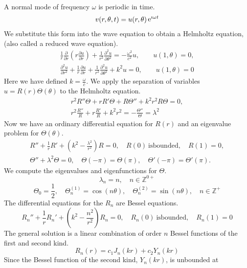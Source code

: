 {%
\begin{Solution}
  \label{solution normal modes drum unit radius}
  A normal mode of frequency $\omega$ is periodic in time.
  \[
  v(r,\theta,t) = u(r,\theta) \mathop{\mathrm{e}}\nolimits^{\imath \omega t}
  \]
  We substitute this form into the wave equation to obtain a Helmholtz equation,
  (also called a reduced wave equation).
  \begin{gather*}
    \frac{1}{r} \frac{\partial}{\partial r} \left( r \frac{\partial u}{\partial r} \right) +
    \frac{1}{r^2} \frac{\partial^2 u}{\partial \theta^2} = -\frac{\omega^2}{c^2} u, \qquad
    u(1,\theta) = 0, 
    \\
    \frac{\partial^2 u}{\partial r^2} + \frac{1}{r} \frac{\partial u}{\partial r} +
    \frac{1}{r^2} \frac{\partial^2 u}{\partial \theta^2} + k^2 u = 0, \qquad
    u(1,\theta) = 0
  \end{gather*}
  Here we have defined $k = \frac{\omega}{c}$.
  We apply the separation of variables $u = R(r) \Theta(\theta)$ to the Helmholtz 
  equation.
  \begin{gather*}
    r^2 R'' \Theta + r R' \Theta + R \Theta'' + k^2 r^2 R \Theta = 0, 
    \\
    r^2 \frac{R''}{R} + r \frac{R'}{R} + k^2 r^2 = - \frac{\Theta''}{\Theta} = \lambda^2
  \end{gather*}
  Now we have an ordinary differential equation for $R(r)$ and
  an eigenvalue problem for $\Theta(\theta)$.
  \begin{gather*}
    R'' + \frac{1}{r} R' + \left( k^2 - \frac{\lambda^2}{r^2} \right) R = 0,
    \quad R(0)\ \mathrm{is bounded}, \quad R(1) = 0, 
    \\
    \Theta'' + \lambda^2 \Theta = 0, \quad \Theta(-\pi) = \Theta(\pi), \quad \Theta'(-\pi) = \Theta'(\pi).
  \end{gather*}
  We compute the eigenvalues and eigenfunctions for $\Theta$.
  \[
  \lambda_n = n, \quad n \in \mathbb{Z}^{0+}
  \]
  \[
  \Theta_0 = \frac{1}{2}, \quad \Theta_n^{(1)} = \cos(n \theta), \quad
  \Theta_n^{(2)} = \sin(n \theta), \quad n \in \mathbb{Z}^+
  \]
  The differential equations for the $R_n$ are Bessel equations.
  \[
  R_n'' + \frac{1}{r} R_n' + \left( k^2 - \frac{n^2}{r^2} \right) R_n = 0,
  \quad R_n(0)\ \mathrm{is bounded}, \quad R_n(1) = 0
  \]
  The general solution is a linear combination of order $n$ Bessel functions of
  the first and second kind.
  \[
  R_n(r) = c_1 J_n(k r) + c_2 Y_n(k r)
  \]
  Since the Bessel function of the second kind, $Y_n(k r)$, is unbounded at 

\end{Solution}}
